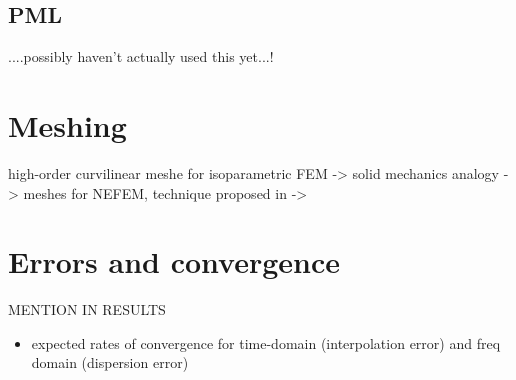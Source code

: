 \subsection{PML}
....possibly haven't actually used this yet...!


\section{Meshing}

high-order curvilinear meshe for isoparametric FEM -> solid mechanics analogy -> \cite{DGPaper:43}
meshes for NEFEM, technique proposed in -> \cite{DGPaper:44}

\section{Errors and convergence}
MENTION IN RESULTS
\begin{itemize}
  \item expected rates of convergence for time-domain (interpolation error) and freq domain (dispersion error)
\end{itemize}

